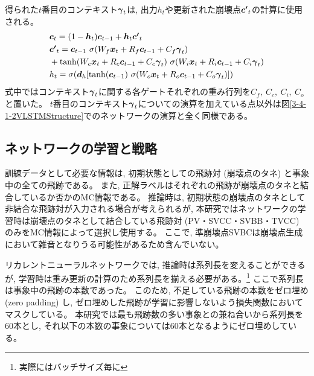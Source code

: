 得られた$t$番目のコンテキスト${\mbox{\boldmath{$\gamma$}}}_{t}$は, 出力$h_{t}$や更新された崩壊点${\mbox{\boldmath{$c'$}}}_{t}$の計算に使用される。
\begin{equation}
 \begin{split}
  &{\mbox{\boldmath{$c$}}}_{t} 
  = (1-{\mbox{\boldmath{$h$}}}_t) {\mbox{\boldmath{$c$}}}_{t-1} + {\mbox{\boldmath{$h$}}}_t {\mbox{\boldmath{$c'$}}}_{t}\\
  &{\mbox{\boldmath{$c'$}}}_{t}
  = {\mbox{\boldmath{$c$}}}_{t-1} \  \sigma (W_f {\mbox{\boldmath{$x$}}}_t + R_f {\mbox{\boldmath{$c$}}}_{t-1} + C_f {\mbox{\boldmath{$\gamma$}}}_{t})\\
  &+ \tanh (W_c {\mbox{\boldmath{$x$}}}_t + R_c {\mbox{\boldmath{$c$}}}_{t-1} + C_c {\mbox{\boldmath{$\gamma$}}}_{t}) \  \sigma (W_i {\mbox{\boldmath{$x$}}}_t + R_i {\mbox{\boldmath{$c$}}}_{t-1} + C_i {\mbox{\boldmath{$\gamma$}}}_{t})\\
  &h_{t} 
  = \sigma ({\mbox{\boldmath{$d$}}}_h [\tanh({\mbox{\boldmath{$c$}}}_{t-1}) \  \sigma (W_o {\mbox{\boldmath{$x$}}}_t + R_o {\mbox{\boldmath{$c$}}}_{t-1} + C_o {\mbox{\boldmath{$\gamma$}}}_{t}) ])
 \end{split}
\end{equation}
式中ではコンテキスト${\mbox{\boldmath{$\gamma$}}}_{t}$に関する各ゲートそれぞれの重み行列を$C_f,\ C_c,\ C_i,\ C_o$と置いた。
$t$番目のコンテキスト${\mbox{\boldmath{$\gamma$}}}_{t}$についての演算を加えている点以外は図\ref{3-4-1-2VLSTMStructure}でのネットワークの演算と全く同様である。


\subsection{ネットワークの学習と戦略} \label{Net:VLSTM:TrainingandStrategyofVLSTM}

訓練データとして必要な情報は, 初期状態としての飛跡対 (崩壊点のタネ) と事象中の全ての飛跡である。
また, 正解ラベルはそれぞれの飛跡が崩壊点のタネと結合しているか否かのMC情報である。
推論時は, 初期状態の崩壊点のタネとして非結合な飛跡対が入力される場合が考えられるが, 本研究ではネットワークの学習時は崩壊点のタネとして結合している飛跡対 (PV・SVCC・SVBB・TVCC) のみをMC情報によって選択し使用する。
ここで, 準崩壊点SVBCは崩壊点生成において雑音となりうる可能性があるため含んでいない。

リカレントニューラルネットワークでは, 推論時は系列長を変えることができるが, 学習時は重み更新の計算のため系列長を揃える必要がある。\footnote{実際にはバッチサイズ毎に}
ここで系列長は事象中の飛跡の本数であった。
このため, 不足している飛跡の本数をゼロ埋め (zero padding) し, ゼロ埋めした飛跡が学習に影響しないよう損失関数においてマスクしている。
本研究では最も飛跡数の多い事象との兼ね合いから系列長を$60$本とし, それ以下の本数の事象については$60$本となるようにゼロ埋めしている。

